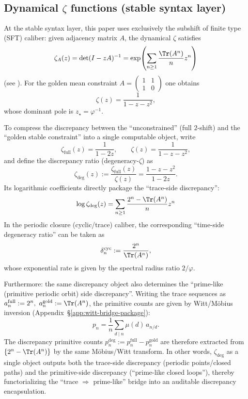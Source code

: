 \subsection{Dynamical \texorpdfstring{$\zeta$}{zeta} functions (stable syntax layer)}\label{subsec:zeta-syntax-zeta}

At the stable syntax layer, this paper uses exclusively the subshift of finite type (SFT) caliber: given adjacency matrix $A$, the dynamical $\zeta$ satisfies
\[
\zeta_A(z)=\det(I-zA)^{-1}
=\exp\!\left(\sum_{n\ge 1}\frac{\Tr(A^n)}{n}z^n\right)
\]
(see \cite{LindMarcus1995}). For the golden mean constraint
\(
A=\begin{pmatrix}1&1\\1&0\end{pmatrix}
\)
one obtains
\[
\zeta(z)=\frac{1}{1-z-z^2},
\]
whose dominant pole is $z_\star=\varphi^{-1}$.

\begin{remark}\label{rem:degeneracy-zeta-bridge}
To compress the discrepancy between the ``unconstrained'' (full $2$-shift) and the ``golden stable constraint'' into a single computable object, write
\[
\zeta_{\mathrm{full}}(z)=\frac{1}{1-2z},
\qquad
\zeta(z)=\frac{1}{1-z-z^2},
\]
and define the discrepancy ratio (degeneracy-$\zeta$) as
\[
\zeta_{\mathrm{deg}}(z):=\frac{\zeta_{\mathrm{full}}(z)}{\zeta(z)}
=\frac{1-z-z^2}{1-2z}.
\]
Its logarithmic coefficients directly package the ``trace-side discrepancy'':
\[
\log \zeta_{\mathrm{deg}}(z)
=\sum_{n\ge 1}\frac{2^n-\Tr(A^n)}{n}z^n
\]
In the periodic closure (cyclic/trace) caliber, the corresponding ``time-side degeneracy ratio'' can be taken as
\[
\delta_n^{\mathrm{cyc}}:=\frac{2^n}{\Tr(A^n)},
\]
whose exponential rate is given by the spectral radius ratio \(2/\varphi\).

Furthermore: the same discrepancy object also determines the ``prime-like (primitive periodic orbit) side discrepancy''. Writing the trace sequences as
\(
a_n^{\mathrm{full}}:=2^n,\ a_n^{\mathrm{gold}}:=\Tr(A^n)
\), the primitive counts are given by Witt/M\"obius inversion (Appendix~\S\ref{app:witt-bridge-package}):
\[
p_n=\frac{1}{n}\sum_{d\mid n}\mu(d)\,a_{n/d}.
\]
The discrepancy primitive counts
\(
p_n^{\mathrm{deg}}:=p_n^{\mathrm{full}}-p_n^{\mathrm{gold}}
\)
are therefore extracted from \(\{2^n-\Tr(A^n)\}\) by the same M\"obius/Witt transform. In other words, \(\zeta_{\mathrm{deg}}\) as a single object outputs both the trace-side discrepancy (periodic points/closed paths) and the primitive-side discrepancy (``prime-like closed loops''), thereby functorializing the ``trace \(\Rightarrow\) prime-like'' bridge into an auditable discrepancy encapsulation.
\end{remark}

